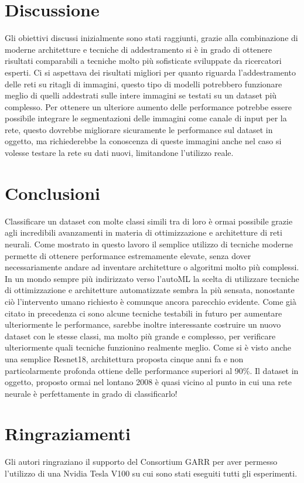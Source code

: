 \section{Discussione}
Gli obiettivi discussi inizialmente sono stati raggiunti, grazie alla combinazione di moderne architetture e tecniche di addestramento si è in grado di ottenere risultati comparabili a tecniche molto più sofisticate sviluppate da ricercatori esperti. Ci si aspettava dei risultati migliori per quanto riguarda l'addestramento delle reti su ritagli di immagini, questo tipo di modelli potrebbero funzionare meglio di quelli addestrati sulle intere immagini se testati su un dataset più complesso. Per ottenere un ulteriore aumento delle performance potrebbe essere possibile integrare le segmentazioni delle immagini come canale di input per la rete, questo dovrebbe migliorare sicuramente le performance sul dataset in oggetto, ma richiederebbe la conoscenza di queste immagini anche nel caso si volesse testare la rete su dati nuovi, limitandone l'utilizzo reale.
\newpage
\section{Conclusioni}
Classificare un dataset con molte classi simili tra di loro è ormai possibile grazie agli incredibili avanzamenti in materia di ottimizzazione e architetture di reti neurali. Come mostrato in questo lavoro il semplice utilizzo di tecniche moderne permette di ottenere performance estremamente elevate, senza dover necessariamente andare ad inventare architetture o algoritmi molto più complessi. In un mondo sempre più indirizzato verso l'autoML la scelta di utilizzare tecniche di ottimizzazione e architetture automatizzate sembra la più sensata, nonostante ciò l'intervento umano richiesto è comunque ancora parecchio evidente. Come già citato in precedenza ci sono alcune tecniche testabili in futuro per aumentare ulteriormente le performance, sarebbe inoltre interessante costruire un nuovo dataset con le stesse classi, ma molto più grande e complesso, per verificare ulteriormente quali tecniche funzionino realmente meglio. Come si è visto anche una semplice Resnet18, architettura proposta cinque anni fa e non particolarmente profonda ottiene delle performance superiori al 90\%. Il dataset in oggetto, proposto ormai nel lontano 2008 è quasi vicino al punto in cui una rete neurale è perfettamente in grado di classificarlo!

\section*{Ringraziamenti}
Gli autori ringraziano il supporto del Consortium GARR per aver permesso l'utilizzo di una Nvidia Tesla V100 su cui sono stati eseguiti tutti gli esperimenti.
\newpage



